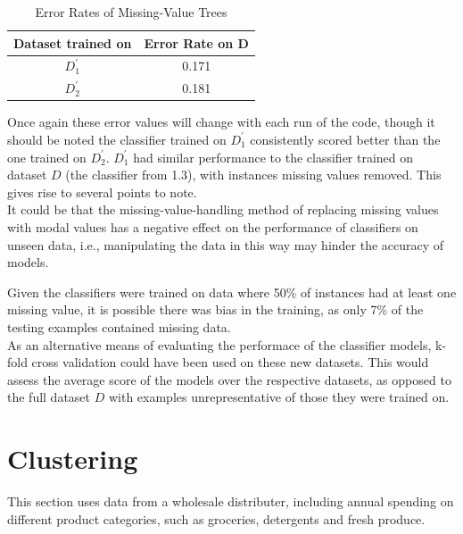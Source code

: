 \documentclass{article}
\begin{document}
\begin{table}
{
        \centering
        \begin{tabular}{|c|c|}
        \hline
        Dataset trained on & Error Rate on D\\
        \hline
        $D^{\prime}_{1}$ & 0.171\\ 
        $D^{\prime}_{2}$ & 0.181\\
        \hline
       \end{tabular}
\caption{Error Rates of Missing-Value Trees}
        \label{table:errs}
}
\end{table}


\vspace{4mm}
Once again these error values will change with each run of the code, though it should be noted the classifier trained on $D^{\prime}_{1}$ consistently 
scored better than the one trained on $D^{\prime}_{2}$. $D^{\prime}_{1}$ had similar performance to the classifier trained on dataset $D$ (the classifier from 1.3), with instances missing values 
removed. This gives rise to several points to note.\\

It could be that the missing-value-handling method of replacing missing values with modal values has a negative effect on the performance of classifiers
on unseen data, i.e., manipulating the data in this way may hinder the accuracy of models.

Given the classifiers were trained on data where 50\% of instances had at least one missing value, it is possible there was bias in the 
training, as only 7\% of the testing examples contained missing data.\\

As an alternative means of evaluating the performace of the classifier models, k-fold cross validation could have been used on these new datasets. This would assess the 
average score of the models over the respective datasets, as opposed to the full dataset $D$ with examples unrepresentative of those they were trained on.



\section{Clustering} 

This section uses data from a wholesale distributer, including annual spending on different product categories, such as groceries,
detergents and fresh produce.
\end{document}
